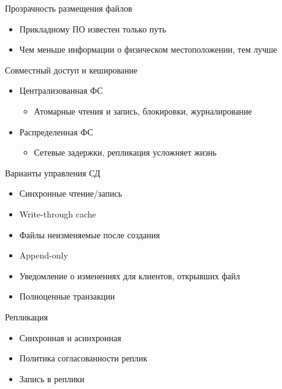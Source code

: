 \documentclass[sans]{beamer}
\begin{document}
\begin{frame}{Прозрачность размещения файлов}
	\begin{itemize}
		\item Прикладному ПО известен только путь
		\item Чем меньше информации о физическом местоположении, тем лучше
	\end{itemize}
\end{frame}

\begin{frame}{Совместный доступ и кеширование}
	\begin{itemize}
		\item Централизованная ФС
		\begin{itemize}
			\item Атомарные чтения и запись, блокировки, журналирование
		\end{itemize}
		\item Распределенная ФС
		\begin{itemize}
			\item Сетевые задержки, репликация усложняет жизнь
		\end{itemize}
	\end{itemize}
\end{frame}

\begin{frame}{Варианты управления СД}
	\begin{itemize}
		\item Синхронные чтение/запись
		\item Write-through cache
		\item Файлы неизменяемые после создания
		\item Append-only
		\item Уведомление о изменениях для клиентов, открывших файл
		\item Полноценные транзакции
	\end{itemize}
\end{frame}

\begin{frame}{Репликация}
	\begin{itemize}
		\item Синхронная и асинхронная
		\item Политика согласованности реплик
		\item Запись в реплики
	\end{itemize}
\end{frame}
\end{document}
